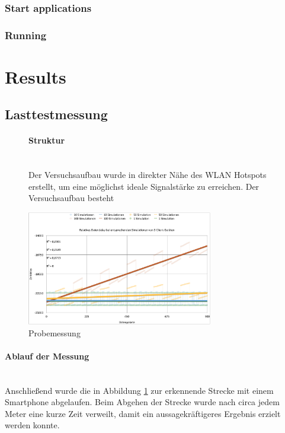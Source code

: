 \documentclass[a4paper]{spie}  %
\begin{document}
\subsubsection{Start applications}


\subsubsection{Running}


\section{Results}\label{result}
\subsection{Lasttestmessung}


\begin{figure}[H]
\begin{minipage}[t]{0.4\textwidth}
\vspace{0pt}
\paragraph{Struktur}\mbox{}\\
Der Versuchsaufbau wurde in direkter Nähe des WLAN Hotspots erstellt, um eine möglichst ideale Signalstärke zu erreichen. Der Versuchsaufbau besteht
\end{minipage}
\hfill
\begin{minipage}[t]{0.5\textwidth}
\vspace{0pt}
\centering
		\includegraphics[height=5cm]{./images/LasttestDiagramm.png}
		\caption{Probemessung}
		\label{fig:probeMessung}
\end{minipage}
\end{figure}

\paragraph{Ablauf der Messung}\mbox{}\\
Anschließend wurde die in Abbildung \ref{fig:probeMessung} zur erkennende Strecke mit einem Smartphone abgelaufen. Beim Abgehen der Strecke wurde nach circa jedem Meter eine kurze Zeit verweilt, damit ein aussagekräftigeres Ergebnis erzielt werden konnte.
\end{document}
